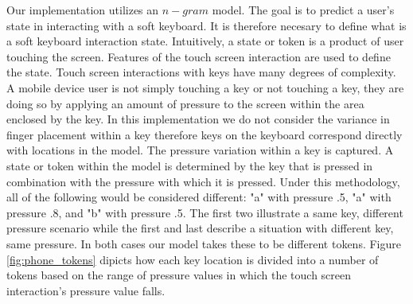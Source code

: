 Our implementation utilizes an $n-gram$ model.
The goal is to predict a user's state in
interacting with a soft keyboard.
%
It is therefore necesary
to define what is a 
soft keyboard interaction state.
%
Intuitively, a state or token is a product of user touching the screen.
Features of the touch screen interaction
are used to define the state.
%
Touch screen interactions with keys have
many degrees of complexity.
A mobile device user is not simply
touching a key or not touching a key,
they are doing so by applying an amount of pressure to the screen
within the area enclosed by the key.
%
In this implementation we do not consider the variance 
in finger placement within a key
therefore keys on the keyboard correspond directly with locations in the model.
The pressure variation within a key is captured.
%
A state or token within the model is
determined by the key that is pressed in combination with
the pressure with which it is pressed.
%
Under this methodology,
all of the following would be considered different:
"a" with pressure .5,
"a" with pressure .8, and
"b" with pressure .5.
The first two illustrate a same key, different pressure scenario
while the first and last describe
a situation with different key, same pressure.
In both cases our model takes these to be 
different tokens.
%
Figure \ref{fig:phone_tokens}
dipicts how each key location is
divided into a number of tokens based on
the range of pressure values in which
the touch screen interaction's pressure value falls.


